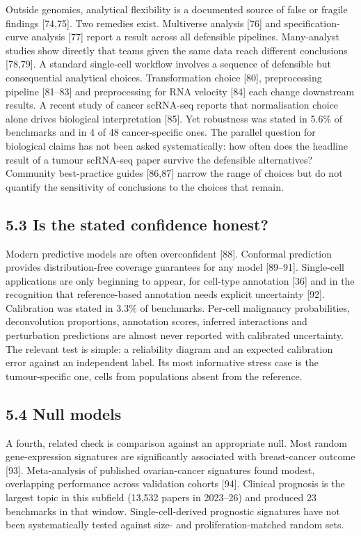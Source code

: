 \documentclass[11pt]{article}
\begin{document}
Outside genomics, analytical flexibility is a documented source of false
or fragile findings {[}74,75{]}. Two remedies exist. Multiverse analysis
{[}76{]} and specification-curve analysis {[}77{]} report a result
across all defensible pipelines. Many-analyst studies show directly that
teams given the same data reach different conclusions {[}78,79{]}. A
standard single-cell workflow involves a sequence of defensible but
consequential analytical choices. Transformation choice {[}80{]},
preprocessing pipeline {[}81--83{]} and preprocessing for RNA velocity
{[}84{]} each change downstream results. A recent study of cancer
scRNA-seq reports that normalisation choice alone drives biological
interpretation {[}85{]}. Yet robustness was stated in 5.6\% of
benchmarks and in 4 of 48 cancer-specific ones. The parallel question
for biological claims has not been asked systematically: how often does
the headline result of a tumour scRNA-seq paper survive the defensible
alternatives? Community best-practice guides {[}86,87{]} narrow the
range of choices but do not quantify the sensitivity of conclusions to
the choices that remain.

\subsection{5.3 Is the stated confidence honest?}\label{is-the-stated-confidence-honest}

Modern predictive models are often overconfident {[}88{]}. Conformal
prediction provides distribution-free coverage guarantees for any model
{[}89--91{]}. Single-cell applications are only beginning to appear, for
cell-type annotation {[}36{]} and in the recognition that
reference-based annotation needs explicit uncertainty {[}92{]}.
Calibration was stated in 3.3\% of benchmarks. Per-cell malignancy
probabilities, deconvolution proportions, annotation scores, inferred
interactions and perturbation predictions are almost never reported with
calibrated uncertainty. The relevant test is simple: a reliability
diagram and an expected calibration error against an independent label.
Its most informative stress case is the tumour-specific one, cells from
populations absent from the reference.

\subsection{5.4 Null models}\label{null-models}

A fourth, related check is comparison against an appropriate null. Most
random gene-expression signatures are significantly associated with
breast-cancer outcome {[}93{]}. Meta-analysis of published
ovarian-cancer signatures found modest, overlapping performance across
validation cohorts {[}94{]}. Clinical prognosis is the largest topic in
this subfield (13,532 papers in 2023--26) and produced 23 benchmarks in
that window. Single-cell-derived prognostic signatures have not been
systematically tested against size- and proliferation-matched random
sets.
\end{document}
